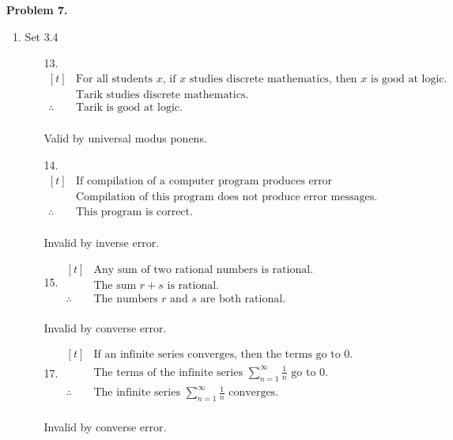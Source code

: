 \documentclass[letterpaper,fleqn]{article}
\begin{document}
\begin{enumerate}
\begin{enumerate}[]
\begin{enumerate}
\begin{enumerate}
				\end{enumerate}
			\end{enumerate}
		\end{enumerate}
		
		\item [] \textbf{Problem 7.}
		\begin{enumerate}[]
			\item Set 3.4
			\begin{enumerate}
				\item [13.]
				$\begin{aligned}[t]
					& \text{For all students $x$, if $x$ studies discrete mathematics, then
					$x$ is good at logic.} \\
					& \text{Tarik studies discrete mathematics.} \\
					\therefore{} & \text{Tarik is good at logic.}
				\end{aligned}$ \\\\
				Valid by universal modus ponens.
				
				\item [14.]
				$\begin{aligned}[t]
					& \text{If compilation of a computer program produces error messages, then the program is not correct.} \\
					& \text{Compilation of this program does not produce error messages.} \\
					\therefore{} & \text{This program is correct.}
				\end{aligned}$ \\\\
				Invalid by inverse error.
				
				\item [15.]
				$\begin{aligned}[t]
					& \text{Any sum of two rational numbers is rational.} \\
					& \text{The sum $r+s$ is rational.} \\
					\therefore{} & \text{The numbers $r$ and $s$ are both rational.}
				\end{aligned}$ \\\\
				Invalid by converse error.
				
				\item [17.]
				$\begin{aligned}[t]
					& \text{If an infinite series converges, then the terms go to 0.} \\
					& \text{The terms of the infinite series $\sum_{n=1}^{\infty}\frac{1}{n}$ go to 0.} \\
					\therefore{} & \text{The infinite series $\sum_{n=1}^{\infty}\frac{1}{n}$ converges.} 
				\end{aligned}$ \\\\
				Invalid by converse error.
				

\end{enumerate}
\end{enumerate}
\end{enumerate}
\end{document}
